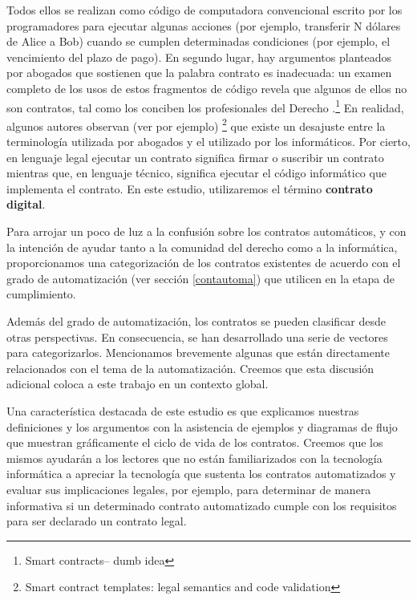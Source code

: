 \documentclass[12pt]{report} %
\begin{document}
Todos ellos se realizan como código de computadora convencional escrito por los programadores para ejecutar algunas acciones (por ejemplo, transferir N dólares de Alice a Bob) cuando se cumplen determinadas condiciones (por ejemplo, el vencimiento del plazo de pago). En segundo lugar, hay argumentos planteados por abogados que sostienen que la palabra contrato es inadecuada: un examen completo de los usos de estos fragmentos de código revela que algunos de ellos no son contratos, tal como los conciben los profesionales del Derecho .\footnote{\cite{Kieron2017}Smart contracts– dumb idea} En realidad, algunos autores observan (ver por ejemplo) \footnote{\cite{Christopher2019} Smart contract templates: legal semantics and code validation} que existe un desajuste entre la terminología utilizada por abogados y el utilizado por los informáticos. Por cierto, en lenguaje legal ejecutar un contrato significa firmar o suscribir un contrato mientras que, en lenguaje técnico,  significa ejecutar el código informático que implementa el contrato. En este estudio, utilizaremos el término \textbf{contrato digital}.

Para arrojar un poco de luz a la confusión sobre los contratos automáticos, y con la intención de ayudar tanto a la comunidad del derecho como a la informática, proporcionamos una categorización de los contratos existentes de acuerdo con el grado de automatización (ver sección \ref{contautoma}) que utilicen en la etapa de cumplimiento.

Además del grado de automatización, los contratos se pueden clasificar desde otras perspectivas. En consecuencia, se han desarrollado una serie de vectores para categorizarlos. Mencionamos brevemente algunas que están directamente relacionados con el tema de la automatización.  Creemos que esta discusión adicional coloca a este trabajo en un contexto global.

Una característica destacada de este estudio es que explicamos nuestras definiciones y los argumentos con la asistencia de ejemplos y diagramas de flujo que muestran gráficamente el ciclo de vida de los contratos. Creemos que los mismos ayudarán a los lectores que no están familiarizados con la tecnología informática a apreciar la tecnología que sustenta los contratos automatizados y evaluar sus implicaciones legales, por ejemplo, para determinar de manera informativa si un determinado contrato automatizado cumple con los requisitos para ser declarado un contrato legal.
\end{document}
